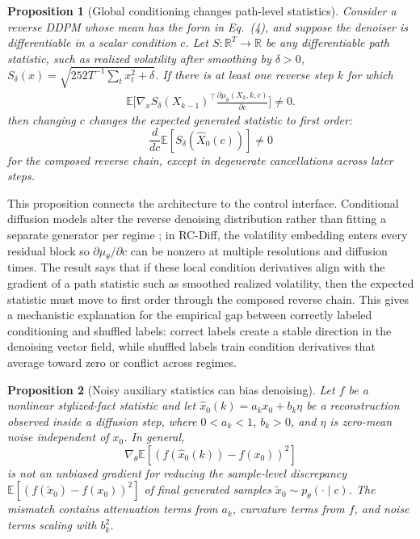 \documentclass[letterpaper]{article}
\newtheorem{proposition}{Proposition}
\begin{document}
\begin{proposition}[Global conditioning changes path-level statistics]
\label{prop:conditioning-flow}
Consider a reverse DDPM whose mean has the form in Eq.~(4), and suppose the denoiser is differentiable in a scalar condition $c$. Let $S:\mathbb{R}^{T}\rightarrow\mathbb{R}$ be any differentiable path statistic, such as realized volatility after smoothing by $\delta>0$, $S_\delta(x)=\sqrt{252T^{-1}\sum_t x_t^2+\delta}$. If there is at least one reverse step $k$ for which
\begin{equation}
\begin{split}
  \mathbb{E}\Big[\nabla_x S_\delta(X_{k-1})^\top
  \frac{\partial \mu_\theta(X_k,k,c)}{\partial c}\Big]\neq0 .
\end{split}
\end{equation}
then changing $c$ changes the expected generated statistic to first order:
\begin{equation}
  \frac{d}{dc}\mathbb{E}[S_\delta(\hat{X}_0(c))]\neq0
\end{equation}
for the composed reverse chain, except in degenerate cancellations across later steps.
\end{proposition}

This proposition connects the architecture to the control interface. Conditional diffusion models alter the reverse denoising distribution rather than fitting a separate generator per regime \citep{tanaka2025cofindiff}; in RC-Diff, the volatility embedding enters every residual block so $\partial\mu_\theta/\partial c$ can be nonzero at multiple resolutions and diffusion times. The result says that if these local condition derivatives align with the gradient of a path statistic such as smoothed realized volatility, then the expected statistic must move to first order through the composed reverse chain. This gives a mechanistic explanation for the empirical gap between correctly labeled conditioning and shuffled labels: correct labels create a stable direction in the denoising vector field, while shuffled labels train condition derivatives that average toward zero or conflict across regimes.

\begin{proposition}[Noisy auxiliary statistics can bias denoising]
\label{prop:noisy-stat-bias}
Let $f$ be a nonlinear stylized-fact statistic and let $\hat{x}_0(k)=a_k x_0+b_k\eta$ be a reconstruction observed inside a diffusion step, where $0<a_k<1$, $b_k>0$, and $\eta$ is zero-mean noise independent of $x_0$. In general,
\begin{equation}
  \nabla_\theta\mathbb{E}\left[(f(\hat{x}_0(k))-f(x_0))^2\right]
\end{equation}
is not an unbiased gradient for reducing the sample-level discrepancy $\mathbb{E}[(f(\tilde{x}_0)-f(x_0))^2]$ of final generated samples $\tilde{x}_0\sim p_\theta(\cdot\mid c)$. The mismatch contains attenuation terms from $a_k$, curvature terms from $f$, and noise terms scaling with $b_k^2$.
\end{proposition}
\end{document}
